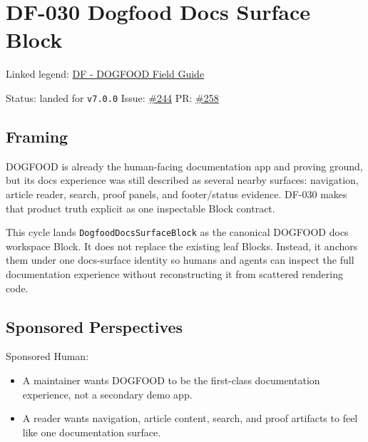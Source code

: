 \chapter{DF-030 Dogfood Docs Surface Block}\label{record-091}

\smallskip

Linked legend: \href{https://github.com/flyingrobots/bijou/blob/1853ad902f6bf219326409e7f743a5a1d6517dbc/docs/legends/DF-dogfood-field-guide.md}{DF - DOGFOOD Field Guide}

Status: landed for \texttt{v\allowbreak{}7\allowbreak{}.\allowbreak{}0\allowbreak{}.\allowbreak{}0} Issue: \href{https://github.com/flyingrobots/bijou/issues/244}{\#244} PR: \href{https://github.com/flyingrobots/bijou/pull/258}{\#258}

\section{Framing}\label{record-091-framing}

DOGFOOD is already the human-facing documentation app and proving ground, but its docs experience was still described as several nearby surfaces: navigation, article reader, search, proof panels, and footer/status evidence. DF-030 makes that product truth explicit as one inspectable Block contract.

This cycle lands \texttt{D\allowbreak{}o\allowbreak{}g\allowbreak{}f\allowbreak{}o\allowbreak{}o\allowbreak{}d\allowbreak{}D\allowbreak{}o\allowbreak{}c\allowbreak{}s\allowbreak{}S\allowbreak{}u\allowbreak{}r\allowbreak{}f\allowbreak{}a\allowbreak{}c\allowbreak{}e\allowbreak{}B\allowbreak{}l\allowbreak{}o\allowbreak{}c\allowbreak{}k} as the canonical DOGFOOD docs workspace Block. It does not replace the existing leaf Blocks. Instead, it anchors them under one docs-surface identity so humans and agents can inspect the full documentation experience without reconstructing it from scattered rendering code.

\section{Sponsored Perspectives}\label{record-091-sponsored-perspectives}

Sponsored Human:

\begin{itemize}
\tightlist
\item
  A maintainer wants DOGFOOD to be the first-class documentation experience, not a secondary demo app.
\item
  A reader wants navigation, article content, search, and proof artifacts to feel like one documentation surface.
\end{itemize}

